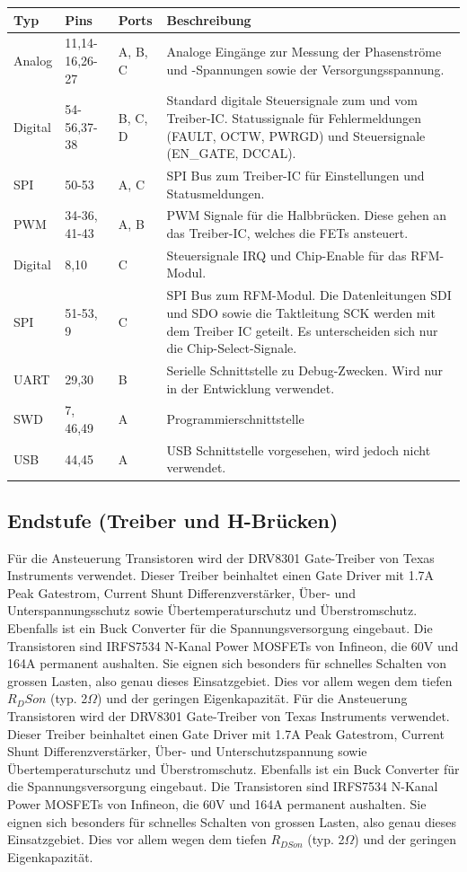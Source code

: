 \begin{tabularx}{\textwidth}{l|l|l|X}
	Typ & Pins & Ports & Beschreibung \\ \hline
	Analog & 
	11,14-16,26-27 & 
	A, B, C &
	Analoge Eingänge zur Messung der Phasenströme und -Spannungen sowie der Versorgungsspannung.
	\\ \hline
	Digital & 
	54-56,37-38 &
	B, C, D &
	Standard digitale Steuersignale zum und vom Treiber-IC. Statussignale für Fehlermeldungen (FAULT, OCTW, PWRGD) und Steuersignale (EN\_GATE, DCCAL).
	\\ \hline
	SPI &
	50-53 &
	A, C &
	SPI Bus zum Treiber-IC für Einstellungen und Statusmeldungen.
	\\ \hline
	PWM &
	34-36, 41-43 &
	A, B &
	PWM Signale für die Halbbrücken. Diese gehen an das Treiber-IC, welches die FETs ansteuert.
	\\ \hline
	Digital &
	8,10 &
	C &
	Steuersignale IRQ und Chip-Enable für das RFM-Modul.
	\\ \hline
	SPI &
	51-53, 9 &
	C &
	SPI Bus zum RFM-Modul. Die Datenleitungen SDI und SDO sowie die Taktleitung SCK werden mit dem Treiber IC geteilt. Es unterscheiden sich nur die Chip-Select-Signale.
	\\ \hline
	UART &
	29,30 &
	B &
	Serielle Schnittstelle zu Debug-Zwecken. Wird nur in der Entwicklung verwendet.
	\\ \hline
	SWD &
	7, 46,49 &
	A &
	Programmierschnittstelle
	\\ \hline
	USB &
	44,45 &
	A &
	USB Schnittstelle vorgesehen, wird jedoch nicht verwendet.
	\\ \hline
\end{tabularx}
\label{tab:iomc}

\subsection*{Endstufe (Treiber und H-Brücken)}
Für die Ansteuerung Transistoren wird der DRV8301 Gate-Treiber von Texas Instruments verwendet. Dieser Treiber beinhaltet einen Gate Driver mit 1.7A Peak Gatestrom, Current Shunt Differenzverstärker, Über- und Unterspannungsschutz sowie Übertemperaturschutz und Überstromschutz. Ebenfalls ist ein Buck Converter für die Spannungsversorgung eingebaut.
Die Transistoren sind IRFS7534 N-Kanal Power MOSFETs von Infineon, die 60V und 164A permanent aushalten. Sie eignen sich besonders für schnelles Schalten von grossen Lasten, also genau dieses Einsatzgebiet. Dies vor allem wegen dem tiefen $R_DSon$ (typ. 2\(\Omega\)) und der geringen Eigenkapazität. 
Für die Ansteuerung Transistoren wird der DRV8301 Gate-Treiber von Texas Instruments verwendet. Dieser Treiber beinhaltet einen Gate Driver mit 1.7A Peak Gatestrom, Current Shunt Differenzverstärker, Über- und Unterschutzspannung sowie Übertemperaturschutz und Überstromschutz. Ebenfalls ist ein Buck Converter für die Spannungsversorgung eingebaut.
Die Transistoren sind IRFS7534 N-Kanal Power MOSFETs von Infineon, die 60V und 164A permanent aushalten. Sie eignen sich besonders für schnelles Schalten von grossen Lasten, also genau dieses Einsatzgebiet. Dies vor allem wegen dem tiefen $R_{DSon}$ (typ. 2\(\Omega\)) und der geringen Eigenkapazität. 

